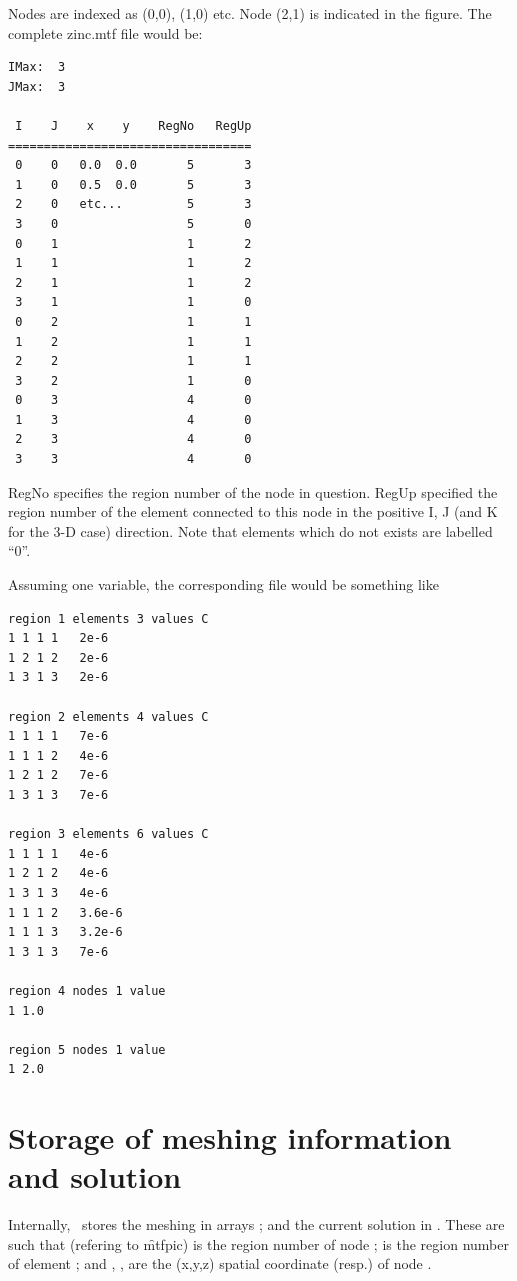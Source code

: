 \documentclass[a4paper,twoside,11pt]{book}
\begin{document}
Nodes are indexed as (0,0), (1,0) etc. Node (2,1) is indicated in the
figure. The complete zinc.mtf file would be:
\begin{verbatim}
IMax:  3
JMax:  3

 I    J    x    y    RegNo   RegUp
==================================
 0    0   0.0  0.0       5       3
 1    0   0.5  0.0       5       3
 2    0   etc...         5       3
 3    0                  5       0
 0    1                  1       2
 1    1                  1       2
 2    1                  1       2
 3    1                  1       0
 0    2                  1       1
 1    2                  1       1
 2    2                  1       1
 3    2                  1       0
 0    3                  4       0
 1    3                  4       0
 2    3                  4       0
 3    3                  4       0
\end{verbatim}
RegNo specifies the region number of the node in question. RegUp
specified the region number of the element connected to this node in
the positive I, J (and K for the 3-D case) direction.  Note that elements which do not
exists are labelled ``0''. 

Assuming one variable, the corresponding  file would be something like

\begin{verbatim}
region 1 elements 3 values C
1 1 1 1   2e-6
1 2 1 2   2e-6
1 3 1 3   2e-6

region 2 elements 4 values C
1 1 1 1   7e-6
1 1 1 2   4e-6
1 2 1 2   7e-6
1 3 1 3   7e-6

region 3 elements 6 values C
1 1 1 1   4e-6
1 2 1 2   4e-6
1 3 1 3   4e-6
1 1 1 2   3.6e-6
1 1 1 3   3.2e-6
1 3 1 3   7e-6

region 4 nodes 1 value
1 1.0

region 5 nodes 1 value
1 2.0
\end{verbatim}

\section{Storage of meshing information and solution}

Internally, \zinc\ stores the meshing in arrays ; and the current solution in . These are such that
(refering to \f{mtfpic})  is the region number of node ;
 is the region number of element ; and
, ,  
are the (x,y,z) spatial coordinate (resp.) of node .
\end{document}
